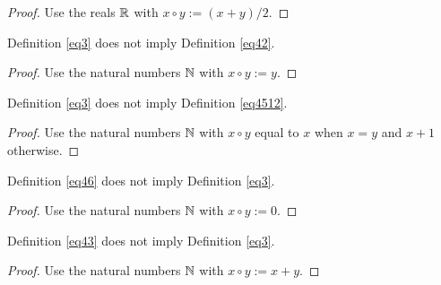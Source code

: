 \begin{proof}\leanok Use the reals $\mathbb{R}$ with $x \circ y := (x+y)/2$.
\end{proof}

\begin{theorem}\label{3_not_imply_42}\leanok{} Definition \ref{eq3} does not imply Definition \ref{eq42}.
\end{theorem}

\begin{proof}\leanok Use the natural numbers $\mathbb{N}$ with $x \circ y := y$.
\end{proof}

\begin{theorem}\label{3_not_imply_4512}\leanok{} Definition \ref{eq3} does not imply Definition \ref{eq4512}.
\end{theorem}

\begin{proof}\leanok Use the natural numbers $\mathbb{N}$ with $x \circ y$ equal to $x$ when $x=y$ and $x+1$ otherwise.
\end{proof}

\begin{theorem}\label{46_not_imply_3}\leanok{} Definition \ref{eq46} does not imply Definition \ref{eq3}.
\end{theorem}

\begin{proof}\leanok Use the natural numbers $\mathbb{N}$ with $x \circ y := 0$.
\end{proof}

\begin{theorem}\label{43_not_imply_3}\leanok{} Definition \ref{eq43} does not imply Definition \ref{eq3}.
\end{theorem}

\begin{proof}\leanok Use the natural numbers $\mathbb{N}$ with $x \circ y := x+y$.
\end{proof}
